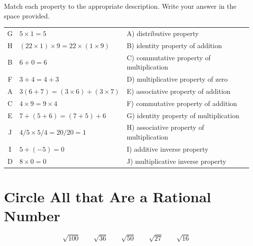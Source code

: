 \documentclass[11pt]{article} %
\begin{document}
Match each property to the appropriate description. Write your answer in the space provided. \\

\begin{tabular}{| c | l | l |}
\hline
G & $ 5 \times 1 = 5$  &  A) distributive property \\
H & $(22 \times 1) \times 9 = 22 \times (1 \times 9)$ & B) identity property of addition \\
B & $6 + 0 = 6$ & C) commutative property of multiplication \\
F & $3 + 4 = 4 + 3$ & D) multiplicative property of zero \\
A & $3(6 + 7) = (3 \times 6) + (3 \times 7)$ & E) associative property of addition \\
C & $4 \times 9 = 9 \times 4$ & F) commutative property of addition \\
E & $7 + (5 + 6) = (7 + 5) + 6$ & G) identity property of multiplication \\
J & $4/5 \times 5/4 = 20/20 = 1$ & H) associative property of multiplication \\
I & $5 + (-5) = 0$ & I) additive inverse property \\
D & $8 \times 0 = 0$ & J) multiplicative inverse property \\
\hline
\end{tabular}

\section{Circle All that Are a Rational Number}

\[
\sqrt{100} \qquad \sqrt{36} \qquad \sqrt{50} \qquad \sqrt{27} \qquad \sqrt{16}
\]
\end{document}

